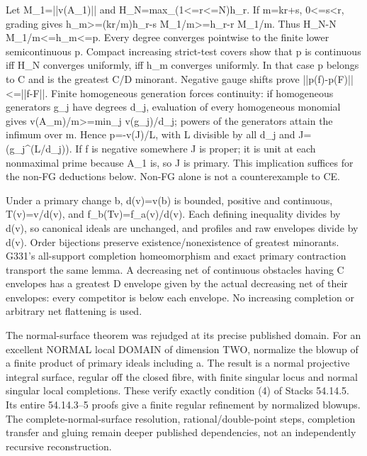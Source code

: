 Let M\_1=||v(A\_1)|| and H\_N=max\_(1\textless{}=r\textless{}=N)h\_r. If m=kr+s, 0\textless{}=s\textless{}r, grading gives h\_m\textgreater{}=(kr/m)h\_r-s M\_1/m\textgreater{}=h\_r-r M\_1/m. Thus H\_N-N M\_1/m\textless{}=h\_m\textless{}=p. Every degree converges pointwise to the finite lower semicontinuous p. Compact increasing strict-test covers show that p is continuous iff H\_N converges uniformly, iff h\_m converges uniformly. In that case p belongs to C and is the greatest C/D minorant. Negative gauge shifts prove ||p(f)-p(F)||\textless{}=||f-F||. Finite homogeneous generation forces continuity: if homogeneous generators g\_j have degrees d\_j, evaluation of every homogeneous monomial gives v(A\_m)/m\textgreater{}=min\_j v(g\_j)/d\_j; powers of the generators attain the infimum over m. Hence p=-v(J)/L, with L divisible by all d\_j and J=(g\_j\textasciicircum{}(L/d\_j)). If f is negative somewhere J is proper; it is unit at each nonmaximal prime because A\_1 is, so J is primary. This implication suffices for the non-FG deductions below. Non-FG alone is not a counterexample to CE.

Under a primary change b, d(v)=v(b) is bounded, positive and continuous, T(v)=v/d(v), and f\_b(Tv)=f\_a(v)/d(v). Each defining inequality divides by d(v), so canonical ideals are unchanged, and profiles and raw envelopes divide by d(v). Order bijections preserve existence/nonexistence of greatest minorants. G331's all-support completion homeomorphism and exact primary contraction transport the same lemma. A decreasing net of continuous obstacles having C envelopes has a greatest D envelope given by the actual decreasing net of their envelopes: every competitor is below each envelope. No increasing completion or arbitrary net flattening is used.

The normal-surface theorem was rejudged at its precise published domain. For an excellent NORMAL local DOMAIN of dimension TWO, normalize the blowup of a finite product of primary ideals including a. The result is a normal projective integral surface, regular off the closed fibre, with finite singular locus and normal singular local completions. These verify exactly condition (4) of Stacks 54.14.5. Its entire 54.14.3--5 proofs give a finite regular refinement by normalized blowups. The complete-normal-surface resolution, rational/double-point steps, completion transfer and gluing remain deeper published dependencies, not an independently recursive reconstruction.


